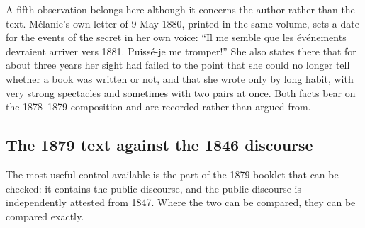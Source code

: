 A fifth observation belongs here although it concerns the author
rather than the text. Mélanie's own letter of 9 May 1880, printed in
the same volume, sets a date for the events of the secret in her own
voice: ``Il me semble que les événements devraient arriver vers
1881. Puissé-je me tromper!'' She also states there that for about
three years her sight had failed to the point that she could no
longer tell whether a book was written or not, and that she wrote
only by long habit, with very strong spectacles and sometimes with
two pairs at once. Both facts bear on the 1878--1879 composition and
are recorded rather than argued from.

\subsection{The 1879 text against the 1846 discourse}

The most useful control available is the part of the 1879 booklet
that can be checked: it contains the public discourse, and the
public discourse is independently attested from 1847. Where the two
can be compared, they can be compared exactly.

